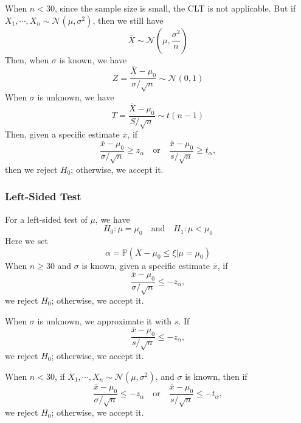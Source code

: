 When \(n < 30\), since the sample size is small, the CLT is not applicable. But if \(X_1, \cdots, X_n \sim \mathcal{N}(\mu, \sigma^2)\), then we still have 
\[
  \overline{X} \sim \mathcal{N} \left( \mu, \frac{\sigma^2}{n} \right)
\]
Then, when \(\sigma\) is known, we have 
\[
  Z = \dfrac{\overline{X} - \mu_0}{\sigma / \sqrt{n}} \sim \mathcal{N}(0, 1)
\]
When \(\sigma\) is unknown, we have 
\[
  T = \dfrac{\overline{X} - \mu_0}{S / \sqrt{n}} \sim t(n - 1)
\]
Then, given a specific estimate \(\overline{x}\), if 
\[
  \frac{\overline{x} - \mu_0}{\sigma / \sqrt{n}} \geq z_{\alpha}
\quad \text{or} \quad
  \frac{\overline{x} - \mu_0}{s / \sqrt{n}} \geq t_{\alpha},
\]
then we reject \(H_0\); otherwise, we accept it.

\subsubsection{Left-Sided Test}
For a left-sided test of \(\mu\), we have 
\[
  H_0: \mu = \mu_0 \quad \text{and} \quad H_1: \mu < \mu_0
\]
Here we set
\[
  \alpha = \mathbb{P} (\overline{X} - \mu_0 \leq \xi \vert \mu = \mu_0)
\]
When \(n \geq 30\) and \(\sigma\) is known, given a specific estimate \(\overline{x}\), if 
\[
  \frac{\overline{x} - \mu_0}{\sigma / \sqrt{n}} \leq -z_{\alpha}, 
\]
we reject \(H_0\); otherwise, we accept it.

When \(\sigma\) is unknown, we approximate it with \(s\). If 
\[
  \frac{\overline{x} - \mu_0}{s / \sqrt{n}} \leq -z_{\alpha},
\]
we reject \(H_0\); otherwise, we accept it.

When \(n < 30\), if \(X_1, \cdots, X_n \sim \mathcal{N}(\mu, \sigma^2)\), and \(\sigma\) is known, then if 
\[
  \frac{\overline{x} - \mu_0}{\sigma / \sqrt{n}} \leq -z_{\alpha}
\quad \text{or} \quad
  \frac{\overline{x} - \mu_0}{s / \sqrt{n}} \leq -t_{\alpha},
\]
we reject \(H_0\); otherwise, we accept it.


